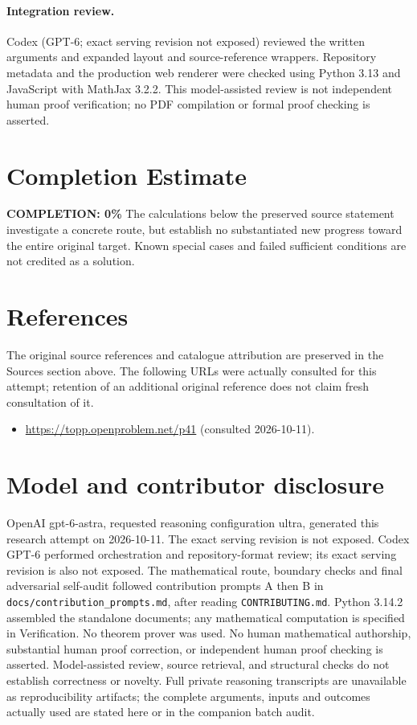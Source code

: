 \documentclass[11pt,a4paper]{article}
\begin{document}
\paragraph{Integration review.} Codex (GPT-6; exact serving revision not exposed) reviewed the written arguments and expanded layout and source-reference wrappers. Repository metadata and the production web renderer were checked using Python 3.13 and JavaScript with MathJax 3.2.2. This model-assisted review is not independent human proof verification; no PDF compilation or formal proof checking is asserted.

\section{Completion Estimate}
\noindent\textbf{COMPLETION: 0\%}
The calculations below the preserved source statement investigate a concrete route,
but establish no substantiated new progress toward the entire original target.
Known special cases and failed sufficient conditions are not credited as a solution.
\section{References}
The original source references and catalogue attribution are preserved in the
Sources section above. The following URLs were actually consulted for this attempt;
retention of an additional original reference does not claim fresh consultation of it.
\begin{itemize}
\item \url{https://topp.openproblem.net/p41} (consulted 2026-10-11). 
\end{itemize}
\section{Model and contributor disclosure}
OpenAI gpt-6-astra, requested reasoning configuration ultra, generated this research
attempt on 2026-10-11. The exact serving revision is not exposed. Codex GPT-6
performed orchestration and repository-format review; its exact serving revision
is also not exposed. The mathematical route, boundary checks and final adversarial
self-audit followed contribution prompts A then B in
\texttt{docs/contribution\_prompts.md}, after reading \texttt{CONTRIBUTING.md}.
Python 3.14.2 assembled the standalone documents; any mathematical computation is
specified in Verification. No theorem prover was used. No human mathematical
authorship, substantial human proof correction, or independent human proof checking
is asserted. Model-assisted review, source retrieval, and structural checks do not
establish correctness or novelty. Full private reasoning transcripts are unavailable
as reproducibility artifacts; the complete arguments, inputs and outcomes actually
used are stated here or in the companion batch audit.
\end{document}
